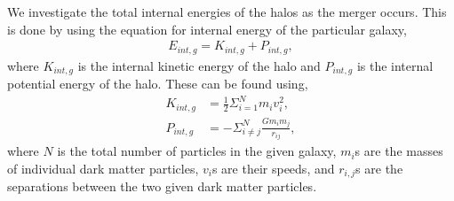 \documentclass[twocolumn]{aastex631}
\begin{document}
We investigate the total internal energies of the halos as the merger occurs. This is done by using the equation for internal energy of the particular galaxy,
\begin{align}
    E_{int,g} = K_{int,g} + P_{int,g},
    \label{eq:internal_energy}
\end{align}
where $K_{int,g}$ is the internal kinetic energy of the halo and $P_{int,g}$ is the internal potential energy of the halo. These can be found using,
\begin{align}
    K_{int,g} &=\frac{1}{2}\Sigma_{i=1}^N m_i v_i^2, \nonumber \\ 
    P_{int,g} &= - \Sigma_{i\neq j}^{N} \frac{G m_i m_j}{r_{ij}},
    \label{eq:kinetic_and_potential_energy}
\end{align}
where $N$ is the total number of particles in the given galaxy, $m_i$s are the masses of individual dark matter particles, $v_i$s are their speeds, and $r_{i,j}$s are the separations between the two given dark matter particles.
\end{document}
